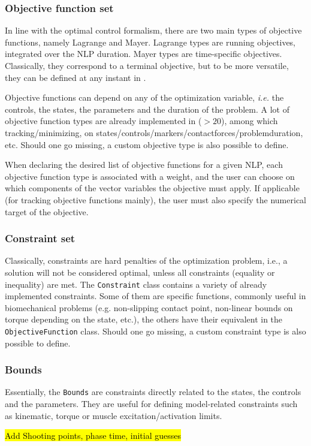 \subsubsection{Objective function set}
In line with the optimal control formalism, there are two main types of objective functions, namely Lagrange and Mayer. 
Lagrange types are running objectives, integrated over the NLP duration. Mayer types are time-specific objectives. 
Classically, they correspond to a terminal objective, but to be more versatile, they can be defined at any instant in \bioptim.

Objective functions can depend on any of the optimization variable, \textit{i.e.} the controls, the states, the parameters and the duration of the problem. 
A lot of objective function types are already implemented in \bioptim ($>\!20$), among which tracking\:/\:minimizing, on states\:/\:controls\:/\:markers\:/\:contact\:forces\:/\:problem\:duration, etc. 
Should one go missing, a custom objective type is also possible to define.

When declaring the desired list of objective functions for a given NLP, each objective function type is associated with a weight, and the user can choose on which components of the vector variables the objective must apply. 
If applicable (for tracking objective functions mainly), the user must also specify the numerical target of the objective.

\subsubsection{Constraint set}
Classically, constraints are hard penalties of the optimization problem, i.e., a solution will not be considered optimal, unless all constraints (equality or inequality) are met.
The \texttt{Constraint} class contains a variety of already implemented constraints.
Some of them are specific functions, commonly useful in biomechanical problems (e.g. non-slipping contact point, non-linear bounds on torque depending on the state, etc.), the others have their equivalent in the \texttt{ObjectiveFunction} class.
Should one go missing, a custom constraint type is also possible to define.

\subsubsection{Bounds}
Essentially, the \texttt{Bounds} are constraints directly related to the states, the controls and the parameters.
They are useful for defining model-related constraints such as kinematic, torque or muscle excitation\:/\:activation limits. 


\hl{Add Shooting points, phase time, initial guesses}

